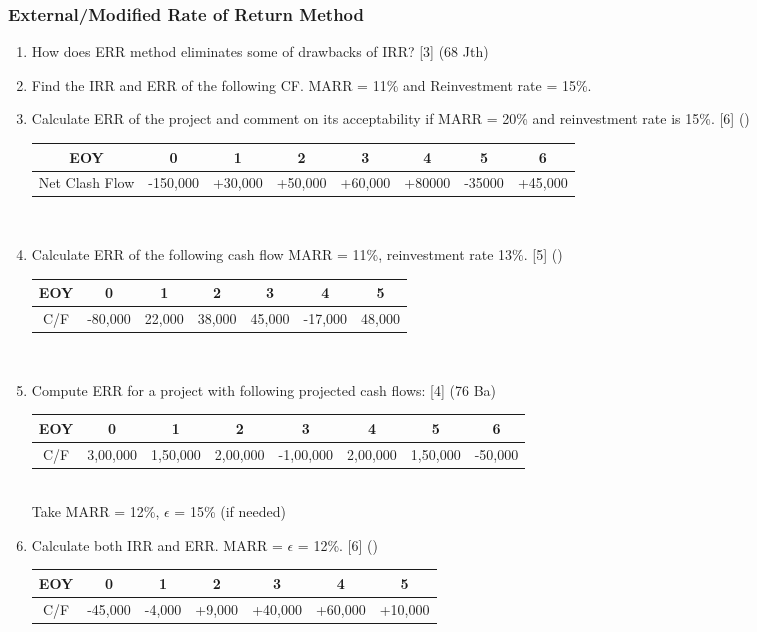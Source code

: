 \documentclass[12pt]{article}
\begin{document}
	\subsubsection{External/Modified Rate of Return Method}
	\begin{enumerate}[noitemsep, topsep = 0pt]
		\item How does ERR method eliminates some of drawbacks of IRR? \hfill [3] (68 Jth)
		
		\item Find the IRR and ERR of the following CF. MARR = 11\% and Reinvestment rate = 15\%.
		
		\item Calculate ERR of the project and comment on its acceptability if MARR = 20\% and reinvestment rate is 15\%. \hfill [6] ()
		\begin{tabular}{|c|c|c|c|c|c|c|c|}
			\hline
			EOY & 0 & 1 & 2 & 3 & 4 & 5 & 6\\ \hline
			Net Clash Flow & -150,000 & +30,000 & +50,000 & +60,000 & +80000 & -35000 & +45,000\\ 
			\hline
		\end{tabular}\\[1pt]
		
		\item Calculate ERR of the following cash flow MARR = 11\%, reinvestment rate 13\%. \hfill [5] ()
		\begin{tabular}{|c|c|c|c|c|c|c|}
			\hline
			EOY & 0 & 1 & 2 & 3 & 4 & 5 \\ \hline
			C/F & -80,000 & 22,000 & 38,000 & 45,000 & -17,000 & 48,000 \\ 
			\hline
		\end{tabular}\\[1pt]
		
		\item Compute ERR for a project with following projected cash flows: \hfill [4] (76 Ba)
		\begin{tabular}{|c|c|c|c|c|c|c|c|}
			\hline
			EOY & 0 & 1 & 2 & 3 & 4 & 5 & 6\\ \hline
			C/F & 3,00,000 & 1,50,000 & 2,00,000 & -1,00,000 & 2,00,000 & 1,50,000 & -50,000\\ 
			\hline
		\end{tabular}\\[0pt]
		Take MARR = 12\%, $\epsilon$ = 15\% (if needed)
		
		\item Calculate both IRR and ERR. MARR = $\epsilon$ = 12\%. \hfill [6] ()
		\begin{tabular}{|c|c|c|c|c|c|c|}
			\hline
			EOY & 0 & 1 & 2 & 3 & 4 & 5\\ \hline
			C/F & -45,000 & -4,000 & +9,000 & +40,000 & +60,000 & +10,000 \\ \hline
		\end{tabular}\\[0pt]
		

\end{enumerate}
\end{document}
